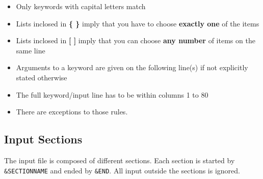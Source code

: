 \documentclass[twoside,10pt,titlepage,a4paper]{article}
\begin{document}
\begin{itemize}
  \item Only keywords with capital letters match

  \item Lists inclosed in \textbf{\{ \}} imply that you have to choose {\bf
    exactly one} of the items

  \item Lists inclosed in \textbf{[ ]} imply that you can choose {\bf any
    number} of items on the same line

  \item Arguments to a keyword are given on the following line(s) if not explicitly stated otherwise

  \item The full keyword/input line has to be within columns 1 to 80

  \item There are exceptions to those rules.

\end{itemize}
%
\clearpage
\subsection{Input Sections}\label{sections}
%
The input file is composed of different sections. Each section is started by
\verb+&SECTIONNAME+ and ended by \verb+&END+. All input outside the
sections is ignored.
\end{document}
